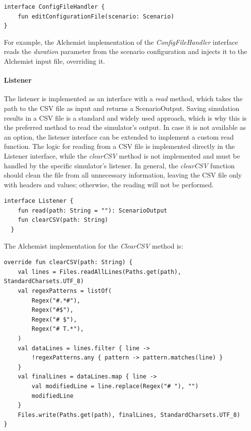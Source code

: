 \documentclass[12pt,a4paper,openright,twoside]{book}
\begin{document}
\begin{lstlisting}[style=my-kotlin, language=my-kotlin, caption={ConfigFileHandler interface}]
  interface ConfigFileHandler {
    fun editConfigurationFile(scenario: Scenario)
}
\end{lstlisting}

For example, the Alchemist implementation of the \emph{ConfigFileHandler} interface reads the \emph{duration} parameter from the scenario configuration and injects it to the Alchemist input file, overriding it.

\paragraph*{Listener}
The listener is implemented as an interface with a \emph{read} method, which takes the path to the CSV file as input and returns a ScenarioOutput. 
Saving simulation results in a CSV file is a standard and widely used approach, which is why this is the preferred method to read the simulator's output. 
In case it is not available as an option, the listener interface can be extended to implement a custom read function. 
The logic for reading from a CSV file is implemented directly in the Listener interface, while the \emph{clearCSV} method is not implemented and must be handled by the specific simulator's listener. 
In general, the \emph{clearCSV} function should clean the file from all unnecessary information, leaving the CSV file only with headers and values; otherwise, the reading will not be performed.

\begin{lstlisting}[style=my-kotlin, language=my-kotlin, caption={Listener interface.}]
  interface Listener {
    fun read(path: String = ""): ScenarioOutput
    fun clearCSV(path: String)
  }
\end{lstlisting}

The Alchemist implementation for the \emph{ClearCSV} method is:

\begin{lstlisting}[style=my-kotlin, language=my-kotlin, caption={CSV file cleaning in Alchemist}]
override fun clearCSV(path: String) {
    val lines = Files.readAllLines(Paths.get(path), StandardCharsets.UTF_8)
    val regexPatterns = listOf(
        Regex("#.*#"),
        Regex("#$"),
        Regex("# $"),
        Regex("# T.*"),
    )
    val dataLines = lines.filter { line ->
        !regexPatterns.any { pattern -> pattern.matches(line) }
    }
    val finalLines = dataLines.map { line ->
        val modifiedLine = line.replace(Regex("# "), "")
        modifiedLine
    }
    Files.write(Paths.get(path), finalLines, StandardCharsets.UTF_8)
}
\end{lstlisting}
\end{document}
